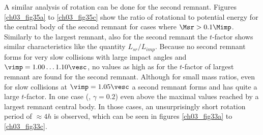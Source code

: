 
A similar analysis of rotation can be done for the second remnant. Figures \ref{ch03_fig35a} to \ref{ch03_fig35c} show the ratio of rotational to potential energy for the central body of the second remnant for cases where $\Msr > 0.1 \Mimp$. Similarly to the largest remnant, also for the second remnant the $t$-factor shows similar characteristics like the quantity $L_{sr} / L_{imp}$. Because no second remnant forms for very slow collisions with large impact angles and $\vimp = 1.00 \dots 1.10 \vesc$, no values as high as for the $t$-factor of largest remnant are found for the second remnant. Although for small mass ratios, even for slow collisions at $\vimp = 1.05 \vesc$ a second remnant forms and has quite a large $t$-factor. In one case (\rss, $\gamma =  0.2$) even above the maximal values reached by a largest remnant central body. In those cases, an unsurprisingly short rotation period of $\approx 4h$ is observed, which can be seen in figures \ref{ch03_fig33a} to \ref{ch03_fig33c}.

